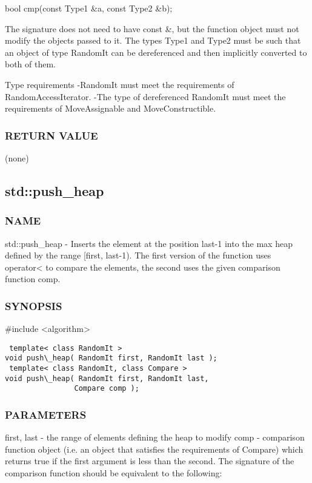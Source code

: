  bool cmp(const Type1 \&a, const Type2 \&b);

The signature does not need to have const \&, but the function object must not modify the objects passed to it.
The types Type1 and Type2 must be such that an object of type RandomIt can be dereferenced and then implicitly converted to both of them.

 Type requirements
 -RandomIt must meet the requirements of RandomAccessIterator.
 -The type of dereferenced RandomIt must meet the requirements of MoveAssignable and MoveConstructible.

\subsubsection{RETURN VALUE}
(none)



\subsection{std::push\_heap}

\subsubsection{NAME}
std::push\_heap - Inserts the element at the position last-1 into the max heap defined by the range [first, last-1). The first version of the function uses operator< to compare the elements, the second uses the given comparison function comp.

\subsubsection{SYNOPSIS}
\#include <algorithm>

\begin{lstlisting}
 template< class RandomIt >
void push\_heap( RandomIt first, RandomIt last );
 template< class RandomIt, class Compare >
void push\_heap( RandomIt first, RandomIt last,
                Compare comp );
\end{lstlisting}

\subsubsection{PARAMETERS}
first, last - the range of elements defining the heap to modify
comp - comparison function object (i.e. an object that satisfies the requirements of Compare) which returns true if the first argument is less than the second.
The signature of the comparison function should be equivalent to the following:

